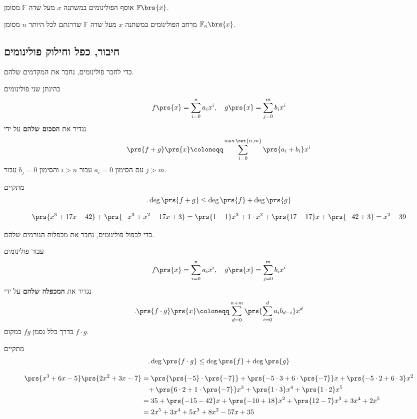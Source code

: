 \documentclass[article, 10pt,oneside]{article}
\renewcommand{\emph}[1]{\textbf{#1}}
\begin{document}
\begin{notation}
אוסף הפולינומים במשתנה
$x$
מעל שדה
$\mathbb{F}$
מסומן
$\mathbb{F}\brs{x}$.
\end{notation}

\begin{notation}
מרחב הפולינומים במשתנה
$x$
מעל שדה
$\mathbb{F}$
שדרגתם לכל היותר
$n$
מסומן
$\mathbb{F}_n\brs{x}$.
\end{notation}

\subsection*{חיבור, כפל וחילוק פולינומים}

כדי לחבר פולינומים, נחבר את המקדמים שלהם.

\begin{definition}
בהינתן שני פולינומים
\[f\prs{x} = \sum_{i = 0}^n a_i x^i, \quad g\prs{x} = \sum_{j=0}^m b_i x^i\]
נגדיר את
\emph{הסכום שלהם}
על ידי
\[\prs{f+g}\prs{x} \coloneqq \sum_{i=0}^{\max\set{n,m}} \prs{a_i + b_i} x^i\]
עם הסימון
$a_i = 0$
עבור
$i > n$
והסימון
$b_j = 0$
עבור
$j > m$.
\end{definition}

\begin{remark}
מתקיים
\[\text{.}\deg\prs{f+g} \leq \deg\prs{f} + \deg\prs{g}\]
\end{remark}

\begin{example}
\[\prs{x^3 + 17x - 42} + \prs{-x^3 + x^2 - 17x + 3} = \prs{1-1}x^3 + 1 \cdot x^2 + \prs{17-17}x + \prs{-42 + 3} = x^2 - 39\]
\end{example}

כדי לכפול פולינומים, נחבר את מכפלות הגורמים שלהם.

\begin{definition}
עבור פולינומים
\[f\prs{x} = \sum_{i = 0}^n a_i x^i, \quad g\prs{x} = \sum_{j = 0}^m b_i x^i\]
נגדיר את
\emph{המכפלה שלהם}
על ידי
\[\text{.} \prs{f \cdot g}\prs{x} \coloneqq \sum_{d = 0}^{n+m} \prs{\sum_{i = 0}^d a_i b_{d-i}} x^d\]
בדרך כלל נסמן
$fg$
במקום
$f \cdot g$.
\end{definition}

\begin{remark}
מתקיים
\[\text{.} \deg\prs{f \cdot g} \leq \deg\prs{f} + \deg\prs{g}\]
\end{remark}

\begin{example}
\begin{align*}
\prs{x^3 + 6x - 5} \prs{2 x^2 + 3 x - 7} &=
\prs{\prs{-5} \cdot \prs{-7}} + \prs{-5 \cdot 3 + 6 \cdot \prs{-7}} x + \prs{-5 \cdot 2 + 6 \cdot 3} x^2 \\&\phantom{=} + \prs{6 \cdot 2 + 1 \cdot \prs{-7}} x^3 + \prs{1 \cdot 3} x^4 + \prs{1 \cdot 2} x^5
\\&=
35 + \prs{-15-42} x + \prs{-10 + 18} x^2 + \prs{12 - 7} x^3 + 3 x^4 + 2 x^5
\\&=
2x^5 + 3x^4 + 5 x^3 + 8 x^2 - 57 x + 35 
\end{align*}
\end{example}
\end{document}

